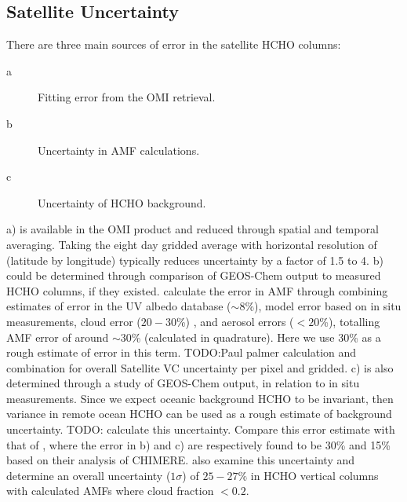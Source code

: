   \subsection{Satellite Uncertainty}
    \label{BioIsop:Uncertianty:Satellite}
    
    There are three main sources of error in the satellite HCHO columns:
    \begin{description}
      \item[a] Fitting error from the OMI retrieval.
      \item[b] Uncertainty in AMF calculations.
      \item[c] Uncertainty of HCHO background.
    \end{description}
    a) is available in the OMI product and reduced through spatial and temporal averaging.
    Taking the eight day gridded average with horizontal resolution of \highhr (latitude by longitude) typically reduces uncertainty by a factor of 1.5 to 4.
    b) could be determined through comparison of GEOS-Chem output to measured HCHO columns, if they existed.
    \textcite{Palmer2006} calculate the error in AMF through combining estimates of error in the UV albedo database ($\sim 8$\%), model error based on in situ measurements, cloud error  ($20-30$\%) \parencite{Martin2003}, and aerosol errors ($<20$\%), totalling AMF error of around $\sim 30$\% (calculated in quadrature).
    Here we use 30\% as a rough estimate of error in this term.
    TODO:Paul palmer calculation and combination for overall Satellite VC uncertainty per pixel and gridded.
    c) is also determined through a study of GEOS-Chem output, in relation to in situ measurements. 
    Since we expect oceanic background HCHO to be invariant, then variance in remote ocean HCHO can be used as a rough estimate of background uncertainty.
    TODO: calculate this uncertainty.
    Compare this error estimate with that of \textcite{Curci2010}, where the error in b) and c) are respectively found to be 30\% and 15\% based on their analysis of CHIMERE.
    \textcite{Millet2008} also examine this uncertainty and determine an overall uncertainty ($1\sigma$) of $25-27\%$ in HCHO vertical columns with calculated AMFs where cloud fraction $< 0.2$.
    
